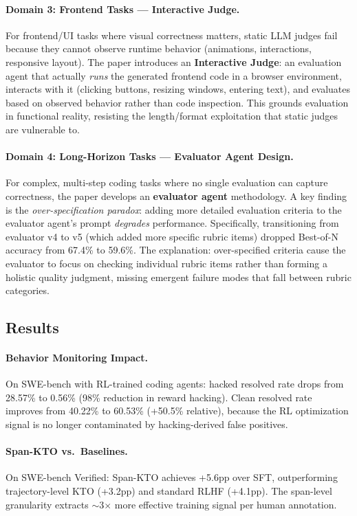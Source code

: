 \documentclass[11pt,a4paper]{article}
\begin{document}
\paragraph{Domain 3: Frontend Tasks --- Interactive Judge.} For frontend/UI tasks where visual correctness matters, static LLM judges fail because they cannot observe runtime behavior (animations, interactions, responsive layout). The paper introduces an \textbf{Interactive Judge}: an evaluation agent that actually \emph{runs} the generated frontend code in a browser environment, interacts with it (clicking buttons, resizing windows, entering text), and evaluates based on observed behavior rather than code inspection. This grounds evaluation in functional reality, resisting the length/format exploitation that static judges are vulnerable to.

\paragraph{Domain 4: Long-Horizon Tasks --- Evaluator Agent Design.} For complex, multi-step coding tasks where no single evaluation can capture correctness, the paper develops an \textbf{evaluator agent} methodology. A key finding is the \emph{over-specification paradox}: adding more detailed evaluation criteria to the evaluator agent's prompt \emph{degrades} performance. Specifically, transitioning from evaluator v4 to v5 (which added more specific rubric items) dropped Best-of-N accuracy from 67.4\% to 59.6\%. The explanation: over-specified criteria cause the evaluator to focus on checking individual rubric items rather than forming a holistic quality judgment, missing emergent failure modes that fall between rubric categories.

\subsection{Results}

\paragraph{Behavior Monitoring Impact.} On SWE-bench with RL-trained coding agents: hacked resolved rate drops from 28.57\% to 0.56\% (98\% reduction in reward hacking). Clean resolved rate improves from 40.22\% to 60.53\% (+50.5\% relative), because the RL optimization signal is no longer contaminated by hacking-derived false positives.

\paragraph{Span-KTO vs.\ Baselines.} On SWE-bench Verified: Span-KTO achieves +5.6pp over SFT, outperforming trajectory-level KTO (+3.2pp) and standard RLHF (+4.1pp). The span-level granularity extracts $\sim$3$\times$ more effective training signal per human annotation.
\end{document}
